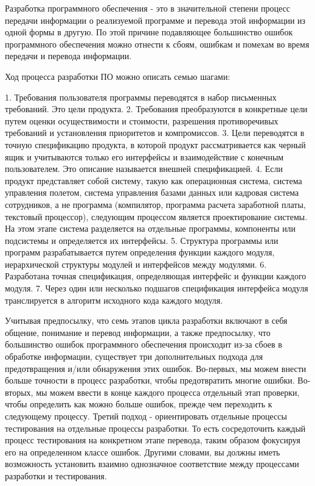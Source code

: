 Разработка программного обеспечения - это в значительной степени процесс передачи информации о 
реализуемой программе и перевода этой информации из одной формы в другую. По этой причине 
подавляющее большинство ошибок программного обеспечения можно отнести к сбоям, ошибкам и 
помехам во время передачи и перевода информации.

Ход процесса разработки ПО можно описать семью шагами:

1. Требования пользователя программы переводятся в набор письменных требований. Это цели продукта.
2. Требования преобразуются в конкретные цели путем оценки осуществимости и стоимости, разрешения противоречивых требований и установления приоритетов и компромиссов.
3. Цели переводятся в точную спецификацию продукта, в которой продукт рассматривается как черный ящик и учитываются только его интерфейсы и взаимодействие с конечным пользователем. Это описание называется внешней спецификацией.
4. Если продукт представляет собой систему, такую как операционная система, система управления полетом, система управления базами данных или кадровая система сотрудников, а не программа (компилятор, программа расчета заработной платы, текстовый процессор), следующим процессом является проектирование системы. На этом этапе система разделяется на отдельные программы, компоненты или подсистемы и определяется их интерфейсы.
5. Структура программы или программ разрабатывается путем определения функции каждого модуля, иерархической структуры модулей и интерфейсов между модулями.
6. Разработана точная спецификация, определяющая интерфейс и функции каждого модуля.
7. Через один или несколько подшагов спецификация интерфейса модуля транслируется в алгоритм исходного кода каждого модуля.

Учитывая предпосылку, что семь этапов цикла разработки включают в себя общение, понимание и 
перевод информации, а также предпосылку, что большинство ошибок программного обеспечения 
происходит из-за сбоев в обработке информации, существует три дополнительных подхода для 
предотвращения и/или обнаружения этих ошибок. Во-первых, мы можем внести больше точности в 
процесс разработки, чтобы предотвратить многие ошибки. Во-вторых, мы можем ввести в конце 
каждого процесса отдельный этап проверки, чтобы определить как можно больше ошибок, прежде чем 
переходить к следующему процессу. Третий подход - ориентировать отдельные процессы 
тестирования на отдельные процессы разработки. То есть сосредоточить каждый процесс 
тестирования на конкретном этапе перевода, таким образом фокусируя его на определенном классе ошибок. %
Другими словами, вы должны иметь возможность установить взаимно однозначное соответствие между процессами разработки и тестирования.

